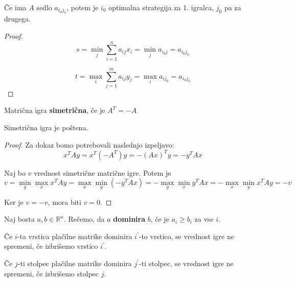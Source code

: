 \documentclass[11pt, a4paper]{article}
\begin{document}
    \begin{proposition}
        Če ima \(A\) sedlo \(a_{i_0 j_0}\), potem je \(i_0\) optimalna strategija za 1. igralca, \(j_0\) pa za drugega.
    \end{proposition}

    \begin{proof}
        \[
            s = \min_j \sum_{i=1}^n a_{ij} x_i = \min_j a_{i_0 j} = a_{i_0 j_0}    
        \]

        \[
            t = \max_i \sum_{j=1}^m a_{ij} y_j = \max_i a_{i j_0} = a_{i_0 j_0}    
        \]
    \end{proof}

    \begin{definition}
        Matrična igra \textbf{simetrična}, če je \(A^T = -A\)
    \end{definition}
    
    \begin{proposition}
        Simetrična igra je poštena. 
    \end{proposition}

    \begin{proof}
        Za dokaz bomo potrebovali naslednjo izpeljavo:
        \[
            x^T A y = x^T (-A^T) y = - (Ax)^T y = - y^T A x
        \]

        Naj bo \(v\) vrednost simetrične matrične igre. Potem je
        \[
            v = \min_y \max_x x^T A y = \max_x \min_y (-y^T A x) = - \max_y \min_x y^T A x = - \max_x \min_y x^T A y = -v
        \]

        Ker je \(v = -v\), mora biti \(v = 0\).
    \end{proof}

    \begin{definition}
        Naj bosta  \(a,b \in \mathbb{R}^n\). Rečemo, da \(a\) \textbf{dominira} \(b\), če je \(a_i \ge b_i\) za vse \(i\).
    \end{definition}

    \begin{proposition}
        Če \(i\)-ta vrstica plačilne matrike dominira \(i^\prime\)-to vrstico, se vrednost igre ne spremeni, če izbrišemo vrstico \(i^\prime\).
    \end{proposition}

    \begin{proposition}
        Če \(j\)-ti stolpec plačilne matrike dominira \(j^\prime\)-ti stolpec, se vrednost igre ne spremeni, če izbrišemo stolpec \(j\).
    \end{proposition}
\end{document}
